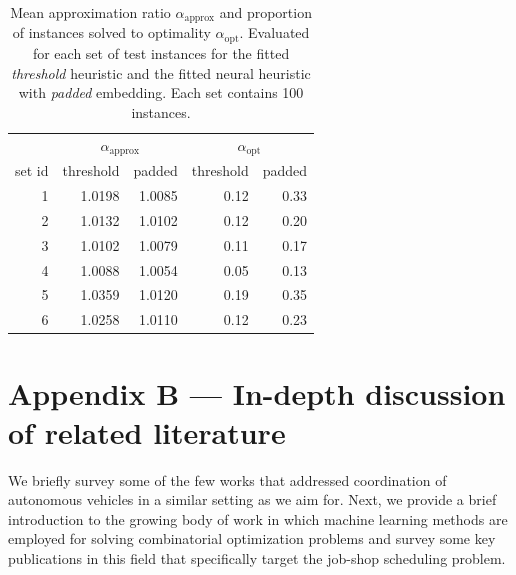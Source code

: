 \documentclass{article}
\theoremstyle{definition}
\theoremstyle{plain}
\begin{document}
%
%
%

\begin{knitrout}
\color{fgcolor}\begin{table}[H]
\centering
\caption{\label{tab:unnamed-chunk-2}Mean approximation ratio
  $\alpha_\text{approx}$ and proportion of instances solved to optimality
  $\alpha_\text{opt}$. Evaluated for each set of test instances for the fitted
  \textit{threshold} heuristic and the fitted neural heuristic with
  \textit{padded} embedding. Each set contains 100
  instances. \label{tab:objectives}}
\vspace{0.5em}
\centering
\begin{tabular}[t]{rrrrr}
\toprule
\multicolumn{1}{c}{ } & \multicolumn{2}{c}{$\alpha_\text{approx}$} & \multicolumn{2}{c}{$\alpha_\text{opt}$} \\
\cmidrule(l{3pt}r{3pt}){2-3} \cmidrule(l{3pt}r{3pt}){4-5}
set id & threshold & padded &  threshold & padded \\
\midrule
1 & 1.0198 & 1.0085  & 0.12 & 0.33\\
2 & 1.0132 & 1.0102  & 0.12 & 0.20\\
3 & 1.0102 & 1.0079  & 0.11 & 0.17\\
4 & 1.0088 & 1.0054  & 0.05 & 0.13\\
5 & 1.0359 & 1.0120  & 0.19 & 0.35\\
6 & 1.0258 & 1.0110  & 0.12 & 0.23\\
\bottomrule
\end{tabular}
\end{table}

\end{knitrout}

\newpage

\section*{Appendix B --- In-depth discussion of related literature}

\renewcommand{\thesection}{B}
\setcounter{subsection}{0}


We briefly survey some of the few works that addressed coordination of
autonomous vehicles in a similar setting as we aim for. Next, we provide a brief
introduction to the growing body of work in which machine learning methods are
employed for solving combinatorial optimization problems and survey some key publications in this field that specifically target the job-shop scheduling problem.
\end{document}
